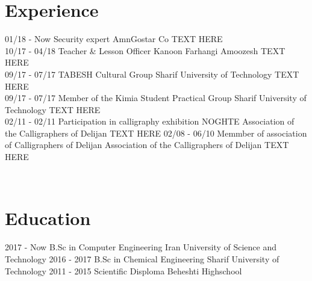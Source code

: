 \documentclass[a4paper]{friggeri-cv}
\begin{document}
\section{Experience}
\begin{entrylist}
  \entry
    {01/18 - Now}
    {Security expert}
    {AmnGostar Co}
    {TEXT HERE\\}
  \entry
    {10/17 - 04/18}
    {Teacher \& Lesson Officer }
    {Kanoon Farhangi Amoozesh}
    {TEXT HERE\\}
  \entry
    {09/17 - 07/17}
    {TABESH Cultural Group}
    {Sharif University of Technology}
        {TEXT HERE\\}
    \entry
    {09/17 - 07/17}
    {Member of the Kimia Student Practical Group}
    {Sharif University of Technology}
    {TEXT HERE\\}
    \entry
    {02/11 - 02/11}
    {Participation in calligraphy exhibition NOGHTE}
    {Association of the Calligraphers of Delijan}
    {TEXT HERE}
    \entry
        {02/08 - 06/10}
    {Memmber of association of Calligraphers of Delijan}
    {Association of the Calligraphers of Delijan}
    {TEXT HERE}
\end{entrylist}
\\
\section{Education}
\begin{entrylist}
  \entry
    {2017 - Now}
    {B.Sc in Computer Engineering}
    {Iran University of Science and Technology}
    {}
  \entry
    {2016 - 2017}
    {B.Sc in Chemical Engineering}
    {Sharif University of Technology}
    {}
  \entry
    {2011 - 2015}
    {Scientific Disploma}
    {Beheshti Highschool}
  {}
\end{entrylist}

\newpage
\end{document}
